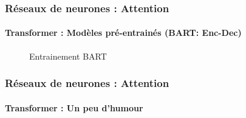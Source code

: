 \documentclass[xcolor=table]{beamer}
\begin{document}
\begin{frame}
	\frametitle{Réseaux de neurones : Attention}
	\framesubtitle{Transformer : Modèles pré-entrainés (BART: Enc-Dec) \cite{bart}}
	
	\begin{figure}[htbp]
		\centering
		\caption{Entrainement BART \cite{bart}}
	\end{figure}
	
\end{frame}


\begin{frame}
	\frametitle{Réseaux de neurones : Attention}
	\framesubtitle{Transformer : Un peu d'humour}
	
	\begin{center}
	\end{center}
	
\end{frame}



\begin{frame}[plain]
	\begin{center}
	\end{center}
\end{frame}
\end{document}

